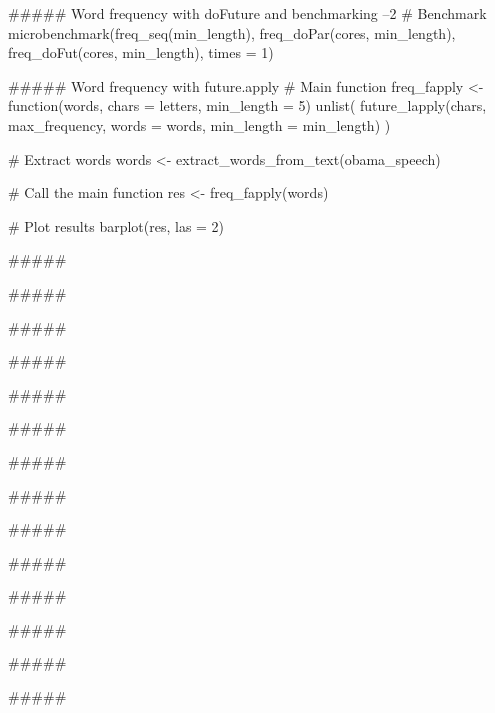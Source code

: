 ##### Word frequency with doFuture and benchmarking  --2
# Benchmark
microbenchmark(freq_seq(min_length), 
               freq_doPar(cores, min_length), 
               freq_doFut(cores, min_length),
               times = 1)

  
  
##### Word frequency with future.apply
# Main function
freq_fapply <- function(words, chars = letters, min_length = 5) {
    unlist(
        future_lapply(chars, max_frequency, words = words, 
                         min_length = min_length)
    )
}

# Extract words
words <- extract_words_from_text(obama_speech)

# Call the main function
res <- freq_fapply(words)

# Plot results
barplot(res, las = 2)





##### 





##### 





##### 





##### 





##### 





##### 





##### 





##### 





##### 





##### 





##### 





##### 





##### 





##### 





